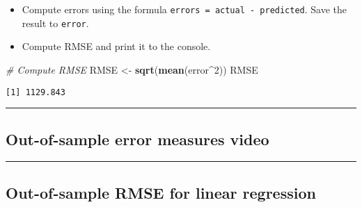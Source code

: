 \documentclass[]{book}
\newenvironment{Shaded}{\begin{snugshade}}{\end{snugshade}}
\newcommand{\KeywordTok}[1]{\textcolor[rgb]{0.13,0.29,0.53}{\textbf{#1}}}
\newcommand{\DecValTok}[1]{\textcolor[rgb]{0.00,0.00,0.81}{#1}}
\newcommand{\StringTok}[1]{\textcolor[rgb]{0.31,0.60,0.02}{#1}}
\newcommand{\CommentTok}[1]{\textcolor[rgb]{0.56,0.35,0.01}{\textit{#1}}}
\newcommand{\OperatorTok}[1]{\textcolor[rgb]{0.81,0.36,0.00}{\textbf{#1}}}
\newcommand{\NormalTok}[1]{#1}
\providecommand{\tightlist}{%
  \setlength{\itemsep}{0pt}\setlength{\parskip}{0pt}}
\begin{document}
\begin{itemize}
\tightlist
\item
  Compute errors using the formula
  \texttt{errors\ =\ actual\ -\ predicted}. Save the result to
  \texttt{error}.
\end{itemize}

\begin{Shaded}
\end{Shaded}

\begin{itemize}
\tightlist
\item
  Compute RMSE and print it to the console.
\end{itemize}

\begin{Shaded}
\begin{Highlighting}[]
\CommentTok{# Compute RMSE}
\NormalTok{RMSE <-}\StringTok{ }\KeywordTok{sqrt}\NormalTok{(}\KeywordTok{mean}\NormalTok{(error}\OperatorTok{^}\DecValTok{2}\NormalTok{))}
\NormalTok{RMSE}
\end{Highlighting}
\end{Shaded}

\begin{verbatim}
[1] 1129.843
\end{verbatim}

\begin{center}\rule{0.5\linewidth}{\linethickness}\end{center}

\subsection*{Out-of-sample error measures
video}\label{out-of-sample-error-measures-video}

\begin{center}\rule{0.5\linewidth}{\linethickness}\end{center}

\subsection*{Out-of-sample RMSE for linear
regression}\label{out-of-sample-rmse-for-linear-regression}
\end{document}
